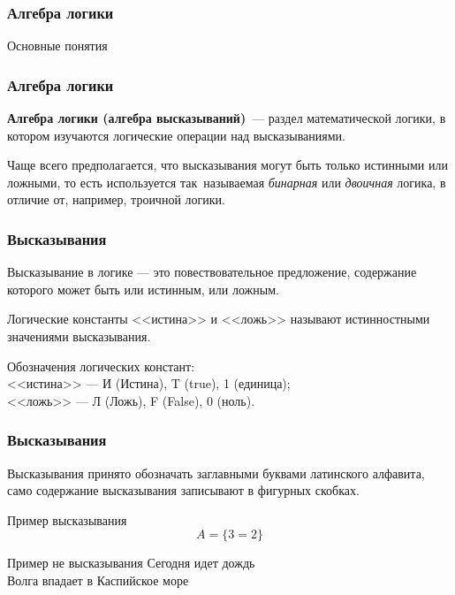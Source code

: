 \subtitle{Лекция 4 --- Алгебра логики. Часть 1}

\frame[plain]
{\titlepage}	%


\begin{frame}
\frametitle{Алгебра логики}

\begin{center}

\Huge
Основные понятия
	
\end{center}


\end{frame}


\begin{frame}
\frametitle{Алгебра логики}

\textbf{Алгебра логики (алгебра высказываний)}~--- раздел математической
логики, в котором изучаются логические операции над высказываниями. 

\pause
Чаще
всего предполагается, что высказывания могут быть только истинными или
ложными, то есть используется так~называемая \emph{бинарная} или
\emph{двоичная} логика, в отличие от, например, троичной логики.


\end{frame}



\begin{frame}
\frametitle{Высказывания}

Высказывание в логике --- это повествовательное предложение, содержание которого может быть или истинным, или ложным.

\pause
Логические константы <<истина>> и <<ложь>> называют истинностными значениями высказывания.

\pause
Обозначения логических констант:\\
<<истина>> ---  И (Истина), T (true), 1 (единица);\\
<<ложь>> ---  Л (Ложь), F (False),  0 (ноль).


\end{frame}

\begin{frame}
\frametitle{Высказывания}

Высказывания принято обозначать заглавными буквами латинского алфавита, само содержание высказывания записывают в фигурных скобках.
\pause
\begin{block}{Пример высказывания}
 $$ A=\{ 3=2 \}$$
\end{block}
\pause
\begin{block}{Пример не высказывания}
 Сегодня идет дождь\\
 Волга впадает в Каспийское море
\end{block}

\end{frame}


